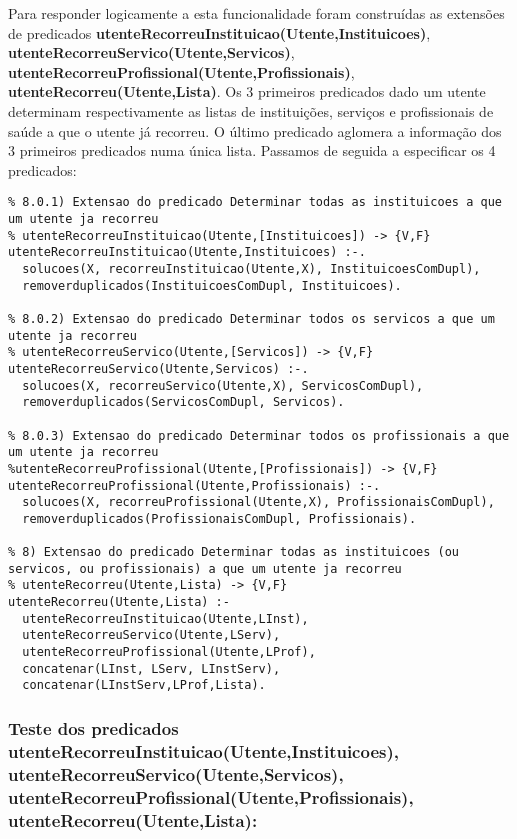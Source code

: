 \documentclass[
  oneside,
  10pt, a4paper,
  footinclude=true,
  headinclude=true,
  cleardoublepage=empty
]{scrbook}
\begin{document}
Para responder logicamente a esta funcionalidade foram construídas as extensões de predicados \textbf{utenteRecorreuInstituicao(Utente,Instituicoes)}, \textbf{utenteRecorreuServico(Utente,Servicos)}, \textbf{utenteRecorreuProfissional(Utente,Profissionais)}, \textbf{utenteRecorreu(Utente,Lista)}. Os 3 primeiros predicados dado um utente determinam respectivamente as listas de instituições, serviços e profissionais de saúde a que o utente já recorreu. O último predicado aglomera a informação dos 3 primeiros predicados numa única lista. Passamos de seguida a especificar os 4 predicados:\par 

\begin{lstlisting}
% 8.0.1) Extensao do predicado Determinar todas as instituicoes a que um utente ja recorreu
% utenteRecorreuInstituicao(Utente,[Instituicoes]) -> {V,F}
utenteRecorreuInstituicao(Utente,Instituicoes) :-.
  solucoes(X, recorreuInstituicao(Utente,X), InstituicoesComDupl),
  removerduplicados(InstituicoesComDupl, Instituicoes).

% 8.0.2) Extensao do predicado Determinar todos os servicos a que um utente ja recorreu
% utenteRecorreuServico(Utente,[Servicos]) -> {V,F}
utenteRecorreuServico(Utente,Servicos) :-.
  solucoes(X, recorreuServico(Utente,X), ServicosComDupl),
  removerduplicados(ServicosComDupl, Servicos).

% 8.0.3) Extensao do predicado Determinar todos os profissionais a que um utente ja recorreu
%utenteRecorreuProfissional(Utente,[Profissionais]) -> {V,F}
utenteRecorreuProfissional(Utente,Profissionais) :-.
  solucoes(X, recorreuProfissional(Utente,X), ProfissionaisComDupl),
  removerduplicados(ProfissionaisComDupl, Profissionais).

% 8) Extensao do predicado Determinar todas as instituicoes (ou servicos, ou profissionais) a que um utente ja recorreu
% utenteRecorreu(Utente,Lista) -> {V,F}
utenteRecorreu(Utente,Lista) :-
  utenteRecorreuInstituicao(Utente,LInst),
  utenteRecorreuServico(Utente,LServ),
  utenteRecorreuProfissional(Utente,LProf),
  concatenar(LInst, LServ, LInstServ),
  concatenar(LInstServ,LProf,Lista).
\end{lstlisting}


\subsubsection{Teste dos predicados \textbf{utenteRecorreuInstituicao(Utente,Instituicoes)}, \textbf{utenteRecorreuServico(Utente,Servicos)}, \textbf{utenteRecorreuProfissional(Utente,Profissionais)}, \textbf{utenteRecorreu(Utente,Lista)}:}
\end{document}
